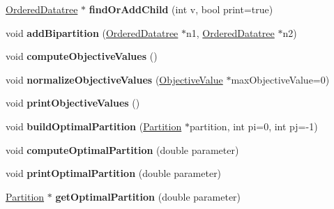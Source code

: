 \begin{DoxyCompactItemize}
\item 
\hypertarget{classOrderedDatatree_a68c7b2e4c94bf5582af68a2ff1071fc3}{\hyperlink{classOrderedDatatree}{Ordered\-Datatree} $\ast$ {\bfseries find\-Or\-Add\-Child} (int v, bool print=true)}\label{classOrderedDatatree_a68c7b2e4c94bf5582af68a2ff1071fc3}

\item 
\hypertarget{classOrderedDatatree_a83c551cab2adf911b1f6157b156c5c0c}{void {\bfseries add\-Bipartition} (\hyperlink{classOrderedDatatree}{Ordered\-Datatree} $\ast$n1, \hyperlink{classOrderedDatatree}{Ordered\-Datatree} $\ast$n2)}\label{classOrderedDatatree_a83c551cab2adf911b1f6157b156c5c0c}

\item 
\hypertarget{classOrderedDatatree_ab70217712cdcda97073d43e00f256515}{void {\bfseries compute\-Objective\-Values} ()}\label{classOrderedDatatree_ab70217712cdcda97073d43e00f256515}

\item 
\hypertarget{classOrderedDatatree_a46a9b17a536cae078a011033ce3e0b80}{void {\bfseries normalize\-Objective\-Values} (\hyperlink{classObjectiveValue}{Objective\-Value} $\ast$max\-Objective\-Value=0)}\label{classOrderedDatatree_a46a9b17a536cae078a011033ce3e0b80}

\item 
\hypertarget{classOrderedDatatree_a9426c2ed6c867e7d1ce983cd4a3667c3}{void {\bfseries print\-Objective\-Values} ()}\label{classOrderedDatatree_a9426c2ed6c867e7d1ce983cd4a3667c3}

\item 
\hypertarget{classOrderedDatatree_aa977ce66823f7939e55d8c4243eb018f}{void {\bfseries build\-Optimal\-Partition} (\hyperlink{classPartition}{Partition} $\ast$partition, int pi=0, int pj=-\/1)}\label{classOrderedDatatree_aa977ce66823f7939e55d8c4243eb018f}

\item 
\hypertarget{classOrderedDatatree_a89d065a30305bbd2dbb3dd20ccae2466}{void {\bfseries compute\-Optimal\-Partition} (double parameter)}\label{classOrderedDatatree_a89d065a30305bbd2dbb3dd20ccae2466}

\item 
\hypertarget{classOrderedDatatree_a7fc372dc95a5002a26cc706ff7c324ba}{void {\bfseries print\-Optimal\-Partition} (double parameter)}\label{classOrderedDatatree_a7fc372dc95a5002a26cc706ff7c324ba}

\item 
\hypertarget{classOrderedDatatree_a58e7431601539e62f1e07c5a07cb221f}{\hyperlink{classPartition}{Partition} $\ast$ {\bfseries get\-Optimal\-Partition} (double parameter)}\label{classOrderedDatatree_a58e7431601539e62f1e07c5a07cb221f}


\end{DoxyCompactItemize}
